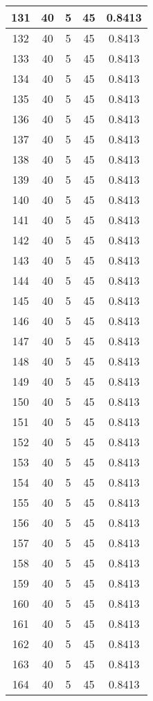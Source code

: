 \documentclass[letterpaper, 12pt]{article}
\begin{document}
\begin{longtable}{|c|c|c|c|c|}
\hline
131 & 40 & 5 & 45 & 0.8413 \\
\hline
132 & 40 & 5 & 45 & 0.8413 \\
\hline
133 & 40 & 5 & 45 & 0.8413 \\
\hline
134 & 40 & 5 & 45 & 0.8413 \\
\hline
135 & 40 & 5 & 45 & 0.8413 \\
\hline
136 & 40 & 5 & 45 & 0.8413 \\
\hline
137 & 40 & 5 & 45 & 0.8413 \\
\hline
138 & 40 & 5 & 45 & 0.8413 \\
\hline
139 & 40 & 5 & 45 & 0.8413 \\
\hline
140 & 40 & 5 & 45 & 0.8413 \\
\hline
141 & 40 & 5 & 45 & 0.8413 \\
\hline
142 & 40 & 5 & 45 & 0.8413 \\
\hline
143 & 40 & 5 & 45 & 0.8413 \\
\hline
144 & 40 & 5 & 45 & 0.8413 \\
\hline
145 & 40 & 5 & 45 & 0.8413 \\
\hline
146 & 40 & 5 & 45 & 0.8413 \\
\hline
147 & 40 & 5 & 45 & 0.8413 \\
\hline
148 & 40 & 5 & 45 & 0.8413 \\
\hline
149 & 40 & 5 & 45 & 0.8413 \\
\hline
150 & 40 & 5 & 45 & 0.8413 \\
\hline
151 & 40 & 5 & 45 & 0.8413 \\
\hline
152 & 40 & 5 & 45 & 0.8413 \\
\hline
153 & 40 & 5 & 45 & 0.8413 \\
\hline
154 & 40 & 5 & 45 & 0.8413 \\
\hline
155 & 40 & 5 & 45 & 0.8413 \\
\hline
156 & 40 & 5 & 45 & 0.8413 \\
\hline
157 & 40 & 5 & 45 & 0.8413 \\
\hline
158 & 40 & 5 & 45 & 0.8413 \\
\hline
159 & 40 & 5 & 45 & 0.8413 \\
\hline
160 & 40 & 5 & 45 & 0.8413 \\
\hline
161 & 40 & 5 & 45 & 0.8413 \\
\hline
162 & 40 & 5 & 45 & 0.8413 \\
\hline
163 & 40 & 5 & 45 & 0.8413 \\
\hline
164 & 40 & 5 & 45 & 0.8413 \\

\end{longtable}
\end{document}
